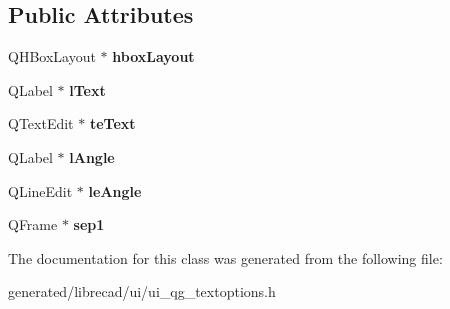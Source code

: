 \subsection*{Public Attributes}
\begin{DoxyCompactItemize}
\item 
\hypertarget{classUi__QG__TextOptions_a1fd72a6d4a07076a424c4f9855197a5d}{Q\-H\-Box\-Layout $\ast$ {\bfseries hbox\-Layout}}\label{classUi__QG__TextOptions_a1fd72a6d4a07076a424c4f9855197a5d}

\item 
\hypertarget{classUi__QG__TextOptions_a3b2f58d3ab2a0e923705164814521b78}{Q\-Label $\ast$ {\bfseries l\-Text}}\label{classUi__QG__TextOptions_a3b2f58d3ab2a0e923705164814521b78}

\item 
\hypertarget{classUi__QG__TextOptions_a80bcc513b05e2f1fd76508de7f1a985b}{Q\-Text\-Edit $\ast$ {\bfseries te\-Text}}\label{classUi__QG__TextOptions_a80bcc513b05e2f1fd76508de7f1a985b}

\item 
\hypertarget{classUi__QG__TextOptions_acd46b5fd4f0c903425647b0ae4f1feaa}{Q\-Label $\ast$ {\bfseries l\-Angle}}\label{classUi__QG__TextOptions_acd46b5fd4f0c903425647b0ae4f1feaa}

\item 
\hypertarget{classUi__QG__TextOptions_ac7695adabd4abf6a542b105564a29773}{Q\-Line\-Edit $\ast$ {\bfseries le\-Angle}}\label{classUi__QG__TextOptions_ac7695adabd4abf6a542b105564a29773}

\item 
\hypertarget{classUi__QG__TextOptions_aa06ea5cbbdf235e22bf93dc5e633888a}{Q\-Frame $\ast$ {\bfseries sep1}}\label{classUi__QG__TextOptions_aa06ea5cbbdf235e22bf93dc5e633888a}

\end{DoxyCompactItemize}


The documentation for this class was generated from the following file\-:\begin{DoxyCompactItemize}
\item 
generated/librecad/ui/ui\-\_\-qg\-\_\-textoptions.\-h\end{DoxyCompactItemize}
